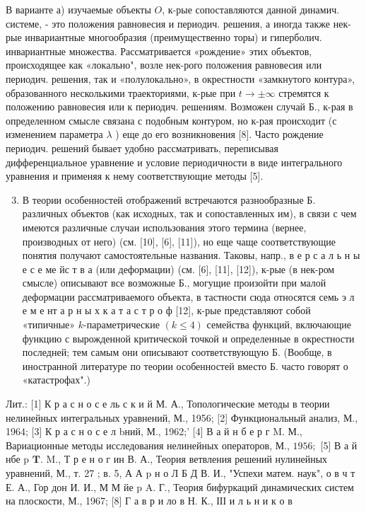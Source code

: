 \documentclass[10pt]{article}
\begin{document}
В варианте а) изучаемые объекты $O$, к-рые сопоставляются данной динамич. системе, - это положения равновесия и периодич. решения, а иногда также нек-рые инвариантные многообразия (преимущественно торы) и гиперболич. инвариантные множества. Рассматривается «рождение» этих объектов, происходящее как «локально", возле нек-рого положения равновесия или периодич. решения, так и «полулокально», в окрестности «замкнутого контура», образованного несколькими траекториями, к-рые при $t \rightarrow \pm \infty$ стремятся к положению равновесия или к периодич. решениям. Возможен случай Б., к-рая в определенном смысле связана с подобным контуром, но к-рая происходит (с изменением параметра $\lambda$ ) еще до его возникновения [8]. Часто рождение периодич. решений бывает удобно рассматривать, переписывая дифференциальное уравнение и условие периодичности в виде интегрального уравнения и применяя к нему соответствующие методы [5].



\begin{enumerate}

  \setcounter{enumi}{2}

  \item В теории особенностей отображений встречаются разнообразные Б. различных объектов (как исходных, так и сопоставленных им), в связи с чем имеются различные случаи использования этого термина (вернее, производных от него) (см. [10], [6], [11]), но еще чаще соответствующие понятия получают самостоятельные названия. Таковы, напр., в е р с а л ь н ы е с е ме йс т в а (или деформации) (см. [6], [11], [12]), к-рые (в нек-ром смысле) описывают все возможные Б., могущие произойти при малой деформации рассматриваемого объекта, в тастности сюда относятся семь э л е м е нт а р н ы х к а т а с т р о ф [12], к-рые представляют собой «типичные» $k$-параметрические $(k \leqslant 4)$ семейства функций, включающие функцию с вырожденной критической точкой и определенные в окрестности последней; тем самым они описывают соответствующую Б. (Вообще, в иностранной литературе по теории особенностей вместо Б. часто говорят о «катастрофах".)

\end{enumerate}



Лит.: [1] К р а с н о с е ль с к и й М. А., Топологические методы в теории нелинейных интегральных уравнений, М., 1956; [2] Функциональный анализ, М., 1964; [3] К р а с н о с е л bний, М., 1962;' [4] В а й н б е р г M. М., Вариационные методы исследования нелинейных операторов, М., $1956 ;$ [5] В а й нбе p $\mathbf{T}$. M., Т р е н о г ин В. А., Теория ветвления решений нулинейных уравнений, М., т. 27 ; в. 5, А А p н о Л Б Д В. И., "Успехи матем. наук", о в ч т Е. А., Гор дон И. И., М М йе p A. Г., Теория бифуркаций динамических систем на плоскости, М., 1967; [8] Г а в р и ло в Н. К., ІІІ и л ь н и к о в
\end{document}
